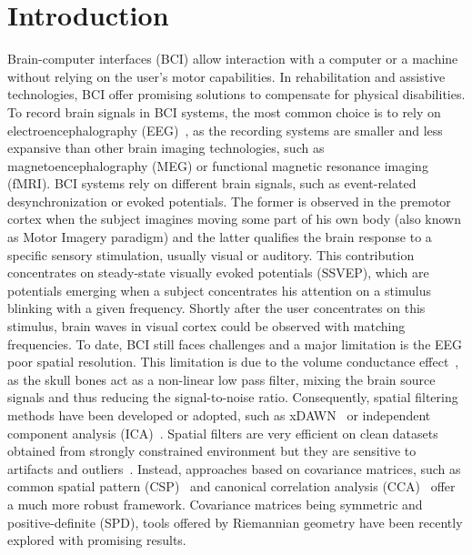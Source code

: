 \section{Introduction}

Brain-computer interfaces (BCI) allow interaction with a computer or a machine without relying on the user's motor capabilities.
In rehabilitation and assistive technologies, BCI offer promising solutions to compensate for physical disabilities.
To record brain signals in BCI systems, the most common choice is to rely on electroencephalography (EEG)~\cite{niedermeyer_electroencephalography:_2005}, as the recording systems are smaller and less expansive than other brain imaging technologies, such as magnetoencephalography (MEG) or functional magnetic resonance imaging (fMRI).
BCI systems rely on different brain signals, such as event-related desynchronization or evoked potentials.
The former is observed in the premotor cortex when the subject imagines moving some part of his own body (also known as Motor Imagery paradigm) and the latter qualifies the brain response to a specific sensory stimulation, usually visual or auditory.
This contribution concentrates on steady-state visually evoked potentials (SSVEP), which are potentials emerging when a subject concentrates his attention on a stimulus blinking with a given frequency.
Shortly after the user concentrates on this stimulus, brain waves in visual cortex could be observed with matching frequencies.
To date, BCI still faces challenges and a major limitation is the EEG poor spatial resolution.
This limitation is due to the volume conductance effect~\cite{niedermeyer_electroencephalography:_2005}, as the skull bones act as a non-linear low pass filter, mixing the brain source signals and thus reducing the signal-to-noise ratio.
Consequently, spatial filtering methods have been developed or adopted, such as xDAWN~\cite{rivet_xdawn_2009} or independent component analysis (ICA)~\cite{wang_enhancing_2006}.
Spatial filters are very efficient on clean datasets obtained from strongly constrained environment but they are sensitive to artifacts and outliers~\cite{tomioka_logistic_2007}.
Instead, approaches based on covariance matrices, such as common spatial pattern (CSP)~\cite{johannes_designing_1999} and canonical correlation analysis (CCA)~\cite{kalunga_ssvep_2013} offer a much more robust framework.
Covariance matrices being symmetric and positive-definite (SPD), tools offered by Riemannian geometry have been recently explored with promising results.

